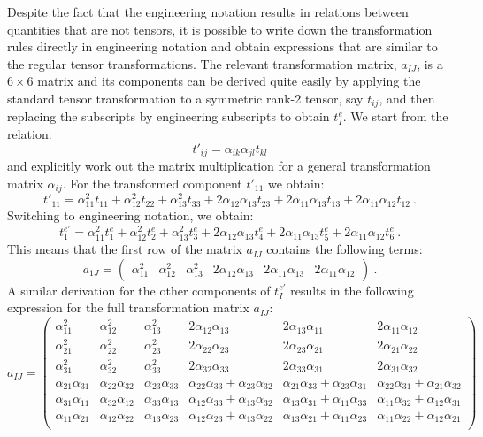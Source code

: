 Despite the fact that the engineering notation results in relations between quantities that are not tensors, it is possible to write down the transformation rules directly in engineering notation and obtain expressions that are similar to the regular tensor transformations. The relevant transformation matrix, $a_{IJ}$, is a $6\times 6$ matrix and its components can be derived quite easily by applying the standard tensor transformation to a symmetric rank-2 tensor, say $t_{ij}$, and then replacing the subscripts by engineering subscripts to obtain $t^e_I$.  We start from the relation:
\[
	t'_{ij} = \alpha_{ik}\alpha_{jl}t_{kl}
\]
and explicitly work out the matrix multiplication for a general transformation matrix $\alpha_{ij}$. For the transformed component $t'_{11}$ we obtain:
\[
	t'_{11} = \alpha^2_{11}t_{11}+\alpha^2_{12}t_{22}+\alpha^2_{13}t_{33}+2\alpha_{12}\alpha_{13}t_{23}+2\alpha_{11}\alpha_{13}t_{13}+2\alpha_{11}\alpha_{12}t_{12}\ .
\]
Switching to engineering notation, we obtain:
\[
	t^{e\prime}_{1} = \alpha^2_{11}t^e_{1}+\alpha^2_{12}t^e_{2}+\alpha^2_{13}t^e_{3}+2\alpha_{12}\alpha_{13}t^e_{4}+2\alpha_{11}\alpha_{13}t^e_{5}+2\alpha_{11}\alpha_{12}t^e_{6}\ .
\]
This means that the first row of the matrix $a_{IJ}$ contains the following terms:
\[
	a_{1J} = \begin{pmatrix} \alpha^2_{11}&\alpha^2_{12}&\alpha^2_{13}&2\alpha_{12}\alpha_{13}&2\alpha_{11}\alpha_{13}&2\alpha_{11}\alpha_{12}\end{pmatrix}\ .
\]
A similar derivation for the other components of $t^{e\prime}_{I}$ results in the following expression  for the full transformation matrix $a_{IJ}$:
{\small\begin{equation}
a_{IJ} = \left(\begin{array}{cccccc}
		\alpha^2_{11}&\alpha^2_{12}&\alpha^2_{13} &2\alpha_{12}\alpha_{13} &2\alpha_{13}\alpha_{11} &2\alpha_{11}\alpha_{12} \\
		\alpha^2_{21}&\alpha^2_{22}&\alpha^2_{23} &2\alpha_{22}\alpha_{23} &2\alpha_{23}\alpha_{21} &2\alpha_{21}\alpha_{22} \\
		\alpha^2_{31}&\alpha^2_{32}&\alpha^2_{33} &2\alpha_{32}\alpha_{33} &2\alpha_{33}\alpha_{31} &2\alpha_{31}\alpha_{32} \\
		\alpha_{21}\alpha_{31}&\alpha_{22}\alpha_{32} &\alpha_{23}\alpha_{33} &\alpha_{22}\alpha_{33}+\alpha_{23}\alpha_{32} &\alpha_{21}\alpha_{33}+\alpha_{23}\alpha_{31} &\alpha_{22}\alpha_{31}+\alpha_{21}\alpha_{32} \\
		\alpha_{31}\alpha_{11}&\alpha_{32}\alpha_{12} &\alpha_{33}\alpha_{13} &\alpha_{12}\alpha_{33}+\alpha_{13}\alpha_{32} &\alpha_{13}\alpha_{31}+\alpha_{11}\alpha_{33} &\alpha_{11}\alpha_{32}+\alpha_{12}\alpha_{31} \\
		\alpha_{11}\alpha_{21}&\alpha_{12}\alpha_{22} &\alpha_{13}\alpha_{23} &\alpha_{12}\alpha_{23}+\alpha_{13}\alpha_{22} &\alpha_{13}\alpha_{21}+\alpha_{11}\alpha_{23} &\alpha_{11}\alpha_{22}+\alpha_{12}\alpha_{21} \\
		\end{array}\right)\label{\chabbr:eq:aIJ}
\end{equation}}
